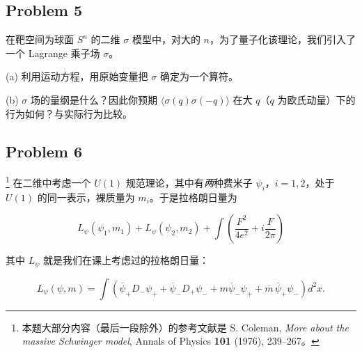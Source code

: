 \subsection*{Problem 5}

在靶空间为球面 $S^n$ 的二维 $\sigma$ 模型中，对大的 $n$，为了量子化该理论，我们引入了一个 Lagrange 乘子场 $\sigma$。

(a) 利用运动方程，用原始变量把 $\sigma$ 确定为一个算符。

(b) $\sigma$ 场的量纲是什么？因此你预期 $\langle\sigma(q)\sigma(-q)\rangle$ 在大 $q$（$q$ 为欧氏动量）下的行为如何？与实际行为比较。


\subsection*{Problem 6}

\footnote{本题大部分内容（最后一段除外）的参考文献是 S. Coleman, \textit{More about the massive Schwinger model}, Annals of Physics \textbf{101} (1976), 239--267。}%
在二维中考虑一个 $U(1)$ 规范理论，其中有\emph{两}种费米子 $\psi_i$，$i=1,2$，处于 $U(1)$ 的同一表示，裸质量为 $m_i$。于是拉格朗日量为

\begin{equation}
  \tag{5}
  \label{eq:ex-5}
  L_\psi(\psi_1,m_1)+L_\psi(\psi_2,m_2)+\int\left(\frac{F^2}{4e^2}+i\frac{F}{2\pi}\right)
\end{equation}

其中 $L_\psi$ 就是我们在课上考虑过的拉格朗日量：

\begin{equation}
  \tag{6}
  \label{eq:ex-6}
  L_\psi(\psi,m)=\int\left(\overline{\psi}_+D_-\psi_++\overline{\psi}_-D_+\psi_-+m\overline{\psi}_-\psi_++\overline{m}\,\overline{\psi}_+\psi_-\right)d^2x .
\end{equation}


